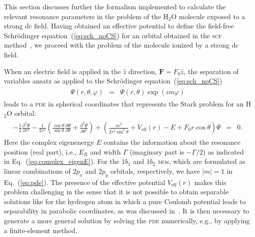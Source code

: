 This section discusses further the formalism implemented to calculate
the relevant resonance parameters in the problem of the H$_{2}$O
molecule exposed to a strong dc field. Having obtained an effective
potential to define the field-free Schr\"{o}dinger
equation~(\ref{eq:sch_noCS}) for an orbital obtained in the
\textsc{scf} method~\cite{Moccia_1964}, we proceed with the problem of
the molecule ionized by a strong dc field.

When an electric field is applied in the $\hat{z}$ direction,
$\mathbf{F} = F_{0}\hat{z}$, the separation of variables ansatz as
applied to the Schr\"{o}dinger equation~(\ref{eq:sch_noCS})
%
\begin{eqnarray}
  \begin{split}
    \Psi(r,\theta,\varphi) & = & \Psi(r,\theta)\exp(im\varphi)
  \end{split}
\label{eq:sov}
\end{eqnarray}
%
leads to a \textsc{pde} in spherical coordinates that represents the
Stark problem for an H$_{2}$O orbital:
%
\begin{eqnarray}
 \begin{split}
  -\frac{1}{2} \frac{\partial^{2}\Psi}{\partial r^2} - \frac{1}{2r^2}
  (\frac{\cos\theta}{\sin\theta} \frac{\partial\Psi}{\partial\theta} + 
  \frac{\partial^2 \Psi}{\partial\theta^2})
  + (\frac{m^2}{2r^2 \sin^2\theta} + V_{\mathrm{eff}}(r) - E +
  F_{0}r\cos\theta)\Psi & = & 0.
  \end{split}
\label{eq:pde}
\end{eqnarray}
%
Here the complex eigenenergy $E$ contains the information about the
resonance position (real part), i.e., $E_{R}$ and width $\Gamma$
(imaginary part is $-\Gamma/2$) as indicated in
Eq.~(\ref{eq:complex_eigenE}).
%
%
For the $1b_{1}$ and $1b_{2}$ \textsc{mo}s, which are formulated as
linear combinations of $2p_{x}$ and $2p_{y}$ orbitals, respectively,
we have $|m| = 1$ in Eq.~(\ref{eq:pde}). The presence of the effective
potential $V_{\mathrm{eff}}(r)$ makes this problem challenging in the
sense that it is not possible to obtain separable solutions like for
the hydrogen atom in which a pure Coulomb potential leads to
separability in parabolic coordinates, as was discussed
in~\cite{Telnov_1989}. It is then necessary to generate a more general
solution by solving the \textsc{pde} numerically, e.g., by applying a
finite-element method.

